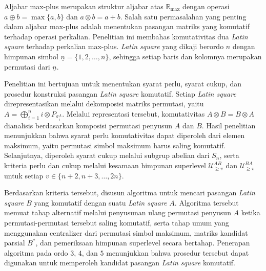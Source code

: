 Aljabar max-plus merupakan struktur aljabar atas $\mathbb{R}_{\max}$ dengan operasi $a\oplus b=\max\{a,b\}$ dan $a\otimes b=a+b$. Salah satu permasalahan yang penting dalam aljabar max-plus adalah menentukan pasangan matriks yang komutatif terhadap operasi perkalian. Penelitian ini membahas komutativitas dua \textit{Latin square} terhadap perkalian max-plus. \textit{Latin square} yang dikaji berordo $n$ dengan himpunan simbol $\underline{n}=\{1,2,\ldots,n\}$, sehingga setiap baris dan kolomnya merupakan permutasi dari $\underline{n}$.

Penelitian ini bertujuan untuk menentukan syarat perlu, syarat cukup, dan prosedur konstruksi pasangan \textit{Latin square} komutatif. Setiap \textit{Latin square} direpresentasikan melalui dekomposisi matriks permutasi, yaitu $A=\bigoplus_{i=1}^{n} i\otimes P_{\sigma_i^A}$. Melalui representasi tersebut, komutativitas $A\otimes B=B\otimes A$ dianalisis berdasarkan komposisi permutasi penyusun $A$ dan $B$. Hasil penelitian menunjukkan bahwa syarat perlu komutativitas dapat diperoleh dari elemen maksimum, yaitu permutasi simbol maksimum harus saling komutatif. Selanjutnya, diperoleh syarat cukup melalui subgrup abelian dari $S_n$, serta kriteria perlu dan cukup melalui kesamaan himpunan superlevel $\mathcal{U}_{\ge v}^{AB}$ dan $\mathcal{U}_{\ge v}^{BA}$ untuk setiap $v\in\{n+2,n+3,\ldots,2n\}$.

Berdasarkan kriteria tersebut, disusun algoritma untuk mencari pasangan \textit{Latin square} $B$ yang komutatif dengan suatu \textit{Latin square} $A$. Algoritma tersebut memuat tahap alternatif melalui penyusunan ulang permutasi penyusun $A$ ketika permutasi-permutasi tersebut saling komutatif, serta tahap umum yang menggunakan centralizer dari permutasi simbol maksimum, matriks kandidat parsial $B^*$, dan pemeriksaan himpunan superlevel secara bertahap. Penerapan algoritma pada ordo $3$, $4$, dan $5$ menunjukkan bahwa prosedur tersebut dapat digunakan untuk memperoleh kandidat pasangan \textit{Latin square} komutatif.




